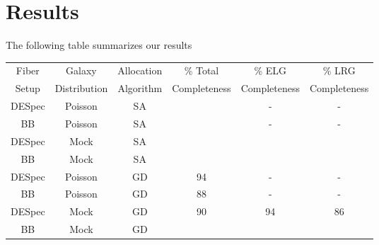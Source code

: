 \documentclass{article}
\begin{document}
\section{Results}

The following table summarizes our results

\begin{table}
\begin{tabular}{cccccc}\hline
Fiber & Galaxy & Allocation & \% Total & \% ELG & \% LRG\\
Setup & Distribution & Algorithm & Completeness & Completeness& Completeness\\\hline
DESpec & Poisson & SA & & -& -\\
BB & Poisson & SA & & -& -\\
DESpec & Mock & SA & & &\\
BB & Mock & SA & & &\\
DESpec & Poisson & GD & 94 & -& -\\
BB & Poisson & GD & 88& -&-\\
DESpec & Mock & GD & 90 & 94 & 86\\
BB & Mock & GD & & &\\\hline
\end{tabular}
\label{Summary of the results.}
\end{table}
\end{document}
